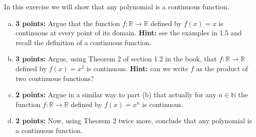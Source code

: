 \documentclass[11pt,a4paper]{article}
\begin{document}
\begin{enumerate}[(a)]
\vspace{12pt}

In this exercise we will show that any polynomial is a continuous function.

\begin{enumerate}[a)]
	\item \textbf{3 points:} Argue that the function $f:\mathbb{R} \to \mathbb{R}$ defined by $f(x) = x$ is continuous at every point of its domain. \textbf{Hint:} see the examples in 1.5 and recall the definition of a continuous function.
	\item \textbf{3 points:} Argue, using Theorem 2 of section 1.2 in the book, that $f:\mathbb{R} \to \mathbb{R}$ defined by $f(x) = x^2$ is continuous.  \textbf{Hint:} can we write $f$ as the product of two continuous functions?
	\item \textbf{2 points:} Argue in a similar way to part (b) that actually for any $n \in \mathbb{N}$ the function $f:\mathbb{R} \to \mathbb{R}$ defined by $f(x) = x^n$ is continuous.
	\item \textbf{2 points:} Now, using Theorem 2 twice more, conclude that any polynomial is a continuous function.
\end{enumerate}


\end{enumerate}
\end{document}
